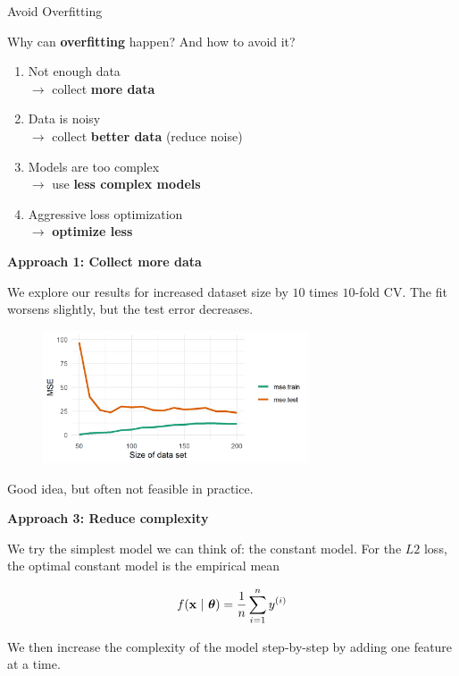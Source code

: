 \documentclass[11pt,compress,t,notes=noshow, xcolor=table]{beamer}
\begin{document}
\begin{vbframe}{Avoid Overfitting} 

Why can \textbf{overfitting} happen? And how to avoid it?
\lz
\lz
\begin{enumerate}
\item Not enough data \\
$\to$ collect \textbf{more data} 
\item Data is noisy \\
$\to$ collect \textbf{better data} (reduce noise) 
\item Models are too complex \\
$\to$ use \textbf{less complex models}
\item Aggressive loss optimization \\
$\to$ \textbf{optimize less}
\end{enumerate}


\framebreak 

\textbf{Approach 1: Collect more data}

\lz 

We explore our results for increased dataset size by $10$ times $10$-fold CV.
The fit worsens slightly, but the test error decreases.

\begin{figure}
\includegraphics[width=0.7\textwidth]{figure/avoid_overfitting_01.png}\\
\end{figure}

Good idea, but often not feasible in practice.

\framebreak

\textbf{Approach 3: Reduce complexity}

\lz 

We try the simplest model we can think of: the constant model. For the $L2$ loss, the optimal constant model is the empirical mean

$$
f(\mathbf{x} ~|~ \bm{\theta}) = \frac{1}{n}\sum\limits_{i=1}^n y^{(i)}
$$

We then increase the complexity of the model step-by-step by adding one feature at a time.


\end{vbframe}
\end{document}
